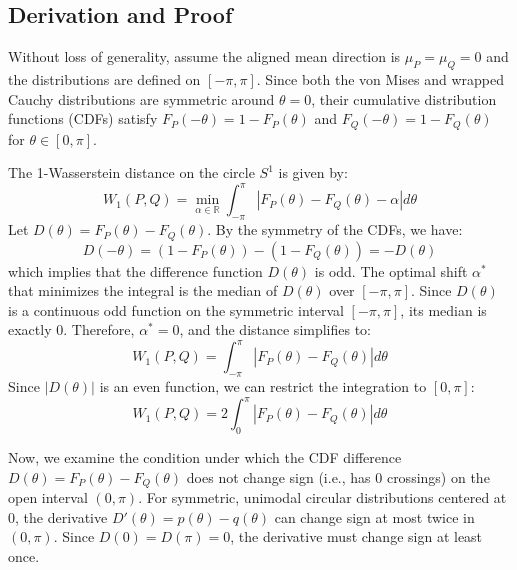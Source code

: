 \documentclass[11pt,a4paper]{article}
\begin{document}
\subsection{Derivation and Proof}
Without loss of generality, assume the aligned mean direction is $\mu_P = \mu_Q = 0$ and the distributions are defined on $[-\pi, \pi]$. Since both the von Mises and wrapped Cauchy distributions are symmetric around $\theta = 0$, their cumulative distribution functions (CDFs) satisfy $F_P(-\theta) = 1 - F_P(\theta)$ and $F_Q(-\theta) = 1 - F_Q(\theta)$ for $\theta \in [0, \pi]$.

The 1-Wasserstein distance on the circle $S^1$ is given by:
\begin{equation}
W_1(P, Q) = \min_{\alpha \in \mathbb{R}} \int_{-\pi}^\pi |F_P(\theta) - F_Q(\theta) - \alpha| d\theta
\end{equation}
Let $D(\theta) = F_P(\theta) - F_Q(\theta)$. By the symmetry of the CDFs, we have:
\begin{equation}
D(-\theta) = (1 - F_P(\theta)) - (1 - F_Q(\theta)) = -D(\theta)
\end{equation}
which implies that the difference function $D(\theta)$ is odd. The optimal shift $\alpha^*$ that minimizes the integral is the median of $D(\theta)$ over $[-\pi, \pi]$. Since $D(\theta)$ is a continuous odd function on the symmetric interval $[-\pi, \pi]$, its median is exactly $0$. Therefore, $\alpha^* = 0$, and the distance simplifies to:
\begin{equation}
W_1(P, Q) = \int_{-\pi}^\pi |F_P(\theta) - F_Q(\theta)| d\theta
\end{equation}
Since $|D(\theta)|$ is an even function, we can restrict the integration to $[0, \pi]$:
\begin{equation}
W_1(P, Q) = 2 \int_0^\pi |F_P(\theta) - F_Q(\theta)| d\theta
\end{equation}

Now, we examine the condition under which the CDF difference $D(\theta) = F_P(\theta) - F_Q(\theta)$ does not change sign (i.e., has 0 crossings) on the open interval $(0, \pi)$. For symmetric, unimodal circular distributions centered at $0$, the derivative $D'(\theta) = p(\theta) - q(\theta)$ can change sign at most twice in $(0, \pi)$. Since $D(0) = D(\pi) = 0$, the derivative must change sign at least once. 
\end{document}
